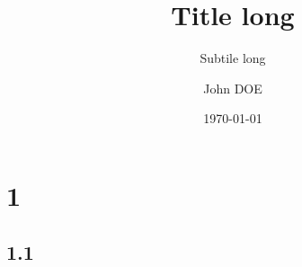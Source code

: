 \documentclass[notheorems, noamsthm, aspectratio=169, 10pt]{beamer}
\title[shorttitle]{Title long}
\subtitle[shortsubtitle]{Subtile long}
\date[shortdate]{\today}
\author[john.doe@mail.com]{John DOE\inst{1}}
\institute[shortinstitute]{\inst{1} An Awesome Company}
\begin{document}

\section{1}
\subsection{1.1}
   \frame{\subsectionpage}

\end{document}
